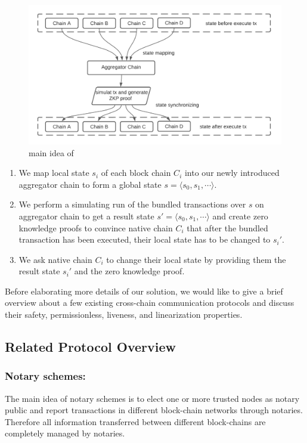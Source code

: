 \documentclass[pageno]{jpaper}
\begin{document}
\begin{figure}[!ht]
\caption{main idea of \dprotocol}
\label{main-idea}
\includegraphics[scale=0.4]{main-idea}
\end{figure}
\begin{enumerate}[leftmargin=*]
\item We map local state $s_i$ of each block chain $C_i$ into our newly introduced aggregator chain to form a global state $s = \langle s_0, s_1, \cdots \rangle$.
\item We perform a simulating run of the bundled transactions over $s$ on aggregator chain to get a result state $s' = \langle s_0, s_1, \cdots \rangle$ and create zero knowledge proofs to convince native chain $C_i$ that after the bundled transaction has been executed, their local state has to be changed to $s_i'$.
\item We ask native chain $C_i$ to change their local state by providing them the result state $s_i'$ and the zero knowledge proof.
\end{enumerate}

Before elaborating more details of our solution, we would like to give a brief overview about a few existing cross-chain communication protocols and discuss their safety, permissionless, liveness, and linearization properties.


\subsection{Related Protocol Overview}
\subsubsection{Notary schemes:}

The main idea of notary schemes is to elect one or more trusted nodes as notary public and report transactions in different block-chain networks through notaries\cite{qin2018overview}. Therefore all information transferred between different block-chains are completely managed by notaries.
\end{document}

